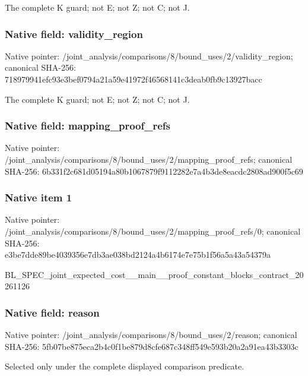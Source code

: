 \documentclass[10pt,a4paper]{article}
\begin{document}
The complete K guard; not E; not Z; not C; not J.


\subsubsection{Native field: validity\_region}


Native pointer: /joint\_analysis/comparis\allowbreak{}ons/8/bound\_uses/2/valid\allowbreak{}ity\_region; canonical SHA-256: 718979941efc93e3bef0794a\allowbreak{}21a59e41972f46568141c3de\allowbreak{}ab0fb9c13927bacc


The complete K guard; not E; not Z; not C; not J.


\subsubsection{Native field: mapping\_proof\_refs}


Native pointer: /joint\_analysis/comparis\allowbreak{}ons/8/bound\_uses/2/mappi\allowbreak{}ng\_proof\_refs; canonical SHA-256: 6b331f2c681d05194a80b106\allowbreak{}7879f9112282e7a4b3de8eac\allowbreak{}dc2808ad900f5c69



\subsubsection{Native item 1}


Native pointer: /joint\_analysis/comparis\allowbreak{}ons/8/bound\_uses/2/mappi\allowbreak{}ng\_proof\_refs/0; canonical SHA-256: e3be7dde89be4039356e7db3\allowbreak{}ae038bd2124a4b6174e7e75b\allowbreak{}1f56a5a43a54379a


BL\_SPEC\_joint\_expected\_c\allowbreak{}ost\_\_main\_\_proof\_constan\allowbreak{}t\_blocks\_contract\_202611\allowbreak{}26


\subsubsection{Native field: reason}


Native pointer: /joint\_analysis/comparis\allowbreak{}ons/8/bound\_uses/2/reaso\allowbreak{}n; canonical SHA-256: 5fb07be875eca2b4c0f1be87\allowbreak{}9d8cfe687c348ff549e593b2\allowbreak{}0a2a91ea43b3303c


Selected only under the complete displayed comparison predicate.
\end{document}
